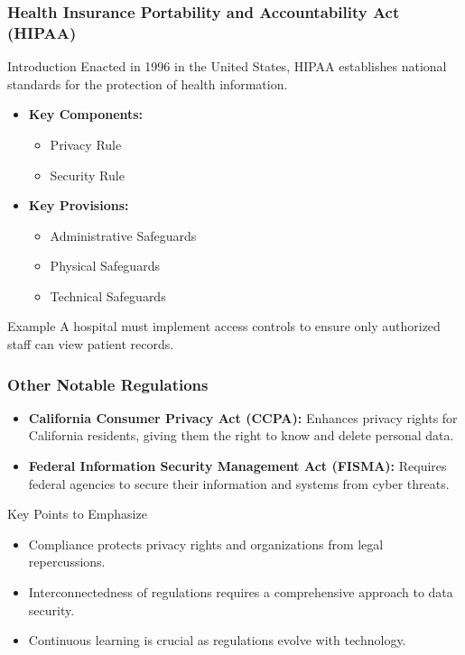 \documentclass{beamer}
\begin{document}
\begin{frame}[fragile]
    \frametitle{Health Insurance Portability and Accountability Act (HIPAA)}

    \begin{block}{Introduction}
        Enacted in 1996 in the United States, HIPAA establishes national standards for the protection of health information.
    \end{block}

    \begin{itemize}
        \item \textbf{Key Components:}
        \begin{itemize}
            \item Privacy Rule
            \item Security Rule
        \end{itemize}
        
        \item \textbf{Key Provisions:}
        \begin{itemize}
            \item Administrative Safeguards
            \item Physical Safeguards
            \item Technical Safeguards
        \end{itemize}
    \end{itemize}

    \begin{block}{Example}
        A hospital must implement access controls to ensure only authorized staff can view patient records.
    \end{block}
\end{frame}

\begin{frame}[fragile]
    \frametitle{Other Notable Regulations}

    \begin{itemize}
        \item \textbf{California Consumer Privacy Act (CCPA):} Enhances privacy rights for California residents, giving them the right to know and delete personal data.
        
        \item \textbf{Federal Information Security Management Act (FISMA):} Requires federal agencies to secure their information and systems from cyber threats.
    \end{itemize}

    \begin{block}{Key Points to Emphasize}
        \begin{itemize}
            \item Compliance protects privacy rights and organizations from legal repercussions.
            \item Interconnectedness of regulations requires a comprehensive approach to data security.
            \item Continuous learning is crucial as regulations evolve with technology.
        \end{itemize}
    \end{block}
\end{frame}
\end{document}
